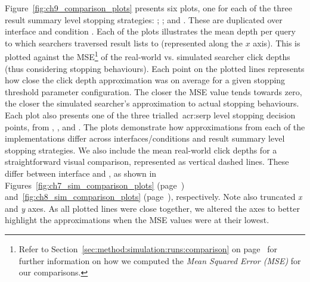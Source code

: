 Figure~\ref{fig:ch9_comparison_plots} presents six plots, one for each of the three result summary level stopping strategies: ; ; and . These are duplicated over interface  and condition . Each of the plots illustrates the mean depth per query to which searchers traversed result lists to (represented along the $x$ axis). This is plotted against the MSE\footnote{Refer to Section~\ref{sec:method:simulation:runs:comparison} on page~\pageref{sec:method:simulation:runs:comparison} for further information on how we computed the \emph{Mean Squared Error (MSE)} for our comparisons.} of the real-world vs. simulated searcher click depths (thus considering stopping behaviours). Each point on the plotted lines represents how close the click depth approximation was on average for a given stopping threshold parameter configuration. The closer the MSE value tends towards zero, the closer the simulated searcher's approximation to actual stopping behaviours. Each plot also presents one of the three trialled~\gls{acr:serp} level stopping decision points, from , , and . The plots demonstrate how approximations from each of the implementations differ across interfaces/conditions and result summary level stopping strategies. We also include the mean real-world click depths for a straightforward visual comparison, represented as vertical dashed lines. These differ between interface  and , as shown in Figures~\ref{fig:ch7_sim_comparison_plots} (page~\pageref{fig:ch7_sim_comparison_plots}) and~\ref{fig:ch8_sim_comparison_plots} (page~\pageref{fig:ch8_sim_comparison_plots}), respectively. Note also truncated \emph{x} and \emph{y} axes. As all plotted lines were close together, we altered the axes to better highlight the approximations when the MSE values were at their lowest.

